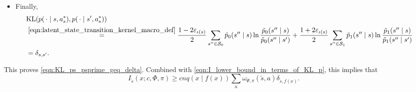 \documentclass[11pt]{article}
\newcommand{\mcS}{\mathcal{S}}
\newcommand{\KL}{\textnormal{KL}}
\theoremstyle{definition}
\theoremstyle{definition}
\begin{document}
\begin{itemize}
	\item[$a = a^*_s = a^*_{s'}$.]
	      Finally,
	      \begin{align}
		       &
		      \KL(p(\,\cdot\mid  s,a^*_s),p(\,\cdot\mid  s',a^*_s))
		      \nonumber
		      \\
		       &
		      \overset{\eqref{eqn:latent_state_transition_kernel_macro_def}}{=}
		      \frac{1-2\varepsilon_{\iota(s)}}{2}
		      \sum_{s''\in\mcS_0}
		      \tilde{p}_0(s'' \mid s)
		      \ln\frac{\tilde{p}_0(s'' \mid s)}{\tilde{p}_0(s'' \mid s')}
		      +
		      \frac{1+2\varepsilon_{\iota(s)}}{2}
		      \sum_{s''\in\mcS_1}
		      \tilde{p}_1(s'' \mid s)
		      \ln\frac{\tilde{p}_1(s'' \mid s)}{\tilde{p}_1(s'' \mid s')}
		      \nonumber \\
		       &
		      =
		      \delta_{s,s'}
		      .
	      \end{align}

\end{itemize}

This proves \eqref{eqn:KL_ps_psprime_geq_delta}.
Combined with \eqref{eqn:I_lower_bound_in_terms_of_KL_p}, this implies that
\begin{equation}
	I_{\tilde{s}}(x;c,\Phi,\pi)
	\geq
	cnq(x\mid f(x))\sum_a\omega_{\Psi,\pi}(\tilde{s},a)\delta_{\tilde{s},f(x)}
	.
	\label{eqn:Itildes_intermediate_bound}
\end{equation}
\end{document}
